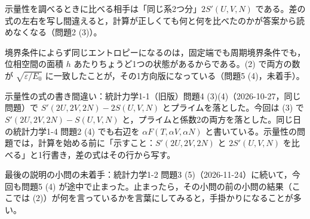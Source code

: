 \documentclass[uplatex,dvipdfmx,a4paper,11pt]{jsarticle}
\begin{document}
\matome
\begin{saitenichiran}
\end{saitenichiran}
\begin{daiji}
  \item 示量性を調べるときに比べる相手は「同じ系2つ分」$2S'(U,V,N)$ である。差の式の左右を写し間違えると，計算が正しくても何と何を比べたのかが答案から読めなくなる（問題2 (3)）。
  \item 境界条件によらず同じエントロピーになるのは，固定端でも周期境界条件でも，位相空間の面積 $h$ あたりちょうど1つの状態があるからである。(2) で両方の数が $\sqrt{\varepsilon/E_{0}}$ に一致したことが，その1方向版になっている（問題5 (4)，未着手）。
\end{daiji}
\begin{maemo}
  \item 示量性の式の書き間違い：統計力学1-1（旧版）問題4 (3)(4)（2026-10-27，同じ問題）で $S'(2U,2V,2N)-2S(U,V,N)$ とプライムを落とした。今回は (3) で $S'(2U,2V,2N)-S(U,V,N)$ と，プライムと係数2の両方を落とした。同じ日の統計力学1-4 問題2 (4) でも右辺を $\alpha F(T,\alpha V,\alpha N)$ と書いている。示量性の問題では，計算を始める前に「示すこと：$S'(2U,2V,2N)$ と $2S'(U,V,N)$ を比べる」と1行書き，差の式はその行から写す。
  \item 最後の説明の小問の未着手：統計力学1-2 問題3 (5)（2026-11-24）に続いて，今回も問題5 (4) が途中で止まった。止まったら，その小問の前の小問の結果（ここでは (2)）が何を言っているかを言葉にしてみると，手掛かりになることが多い。
\end{maemo}
\end{document}
